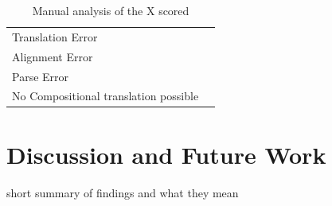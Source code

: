 \documentclass{report}
\theoremstyle{definition}
\theoremstyle{plain}
\begin{document}
\begin{table}[!h]\label{tab:class}
\begin{tabular}{|l|l|}
\hline
Translation Error & \\
Alignment Error & \\
Parse Error &\\
No Compositional translation possible & \\
\hline
\end{tabular}
\caption{Manual analysis of the X scored}
\end{table}

%
%





%
%

\chapter{Discussion and Future Work}

short summary of findings and what they mean



%
% 




%
%
\end{document}
